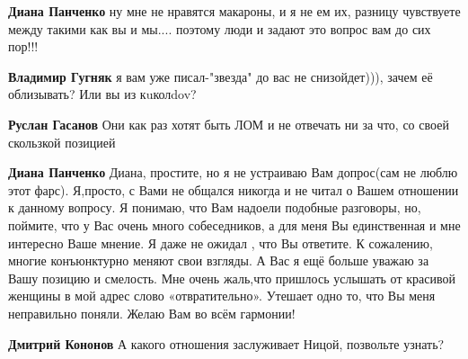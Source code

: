 \begin{itemize}
\begin{itemize}
\textbf{Диана Панченко} ну мне не нравятся макароны, и я не ем их, разницу
чувствуете между такими как вы и мы.... поэтому люди и задают это вопрос вам до
сих пор!!!

 
\textbf{Владимир Гугняк} я вам уже писал-"звезда" до вас не снизойдет))), зачем её облизывать? Или вы из кuколdov?

 
\textbf{Руслан Гасанов} Они как раз хотят быть ЛОМ и не отвечать ни за что, со своей скользкой позицией

 
\textbf{Диана Панченко} Диана, простите, но я не устраиваю Вам допрос(сам не
люблю этот фарс). Я,просто, с Вами не общался никогда и не читал о Вашем
отношении к данному вопросу. Я понимаю, что Вам надоели подобные разговоры, но,
поймите, что у Вас очень много собеседников, а для меня Вы единственная и мне
интересно Ваше мнение. Я даже не ожидал , что Вы ответите. К сожалению, многие
конъюнктурно меняют свои взгляды. А Вас я ещё больше уважаю за Вашу позицию и
смелость. Мне очень жаль,что пришлось услышать от красивой женщины в мой адрес
слово «отвратительно». Утешает одно то, что Вы меня неправильно поняли. Желаю
Вам во всём гармонии!

 
\textbf{Дмитрий Кононов} А какого отношения заслуживает Ницой, позвольте узнать?

 

\end{itemize}
\end{itemize}
